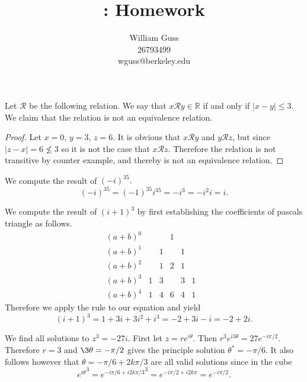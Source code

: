 \documentclass[letter]{article}
\title{\bCLASS: Homework \bHWN}
\author{William Guss\\26793499\\wguss@berkeley.edu}
\newenvironment{menumerate}{%
  \edef\backupindent{\the\parindent}%
  \enumerate%
  \setlength{\parindent}{\backupindent}%
}{\endenumerate}
\begin{document}
\maketitle
\thispagestyle{empty}

\begin{menumerate}
\setcounter{enumi}{31}
	\item Let $\mathcal{R}$ be the following relation. We say that $x \mathcal{R} y \in \mathbb{R}$ if and only if $|x -y| \leq 3$. We claim that the relation is not an equivalence relation.

	\begin{proof}
		Let $x = 0$, $y = 3$, $z =6.$ It is obvious that $x\mathcal{R}y$ and $y\mathcal{R}z$, but since $|z-x| = 6 \not\leq 3$ so it is not the case that $x \mathcal{R} z$. Therefore the relation is not transitive by counter example, and thereby is not an equivalence relation.
	\end{proof}

	\setcounter{enumi}{3}
	\item We compute the result of $(-i)^{35}.$ 
	\begin{equation*}
		(-i)^{35} = (-1)^{35}i^{35} = -i^3 = -i^2i = i.
	\end{equation*}
	\setcounter{enumi}{7}
	\item We compute the result of $(i+1)^3$ by first establishing the coefficients of pascals triangle as follows.
	\begin{equation*}
		\begin{array}{ccccccc}
			{(a+b)}^0&	&&1 \\
			{(a+b)}^1&      & 1 & &1 &   &  \\
			{(a+b)}^2&  & 1 & 2 & 1 &    \\
			{(a+b)}^3& 1 & 3 & & 3 & 1 & \\
			{(a+b)}^4&     1 & 4 & 6 & 4 & 1
		\end{array}
	\end{equation*}
	Therefore we apply the rule to our equation and yield
	\begin{equation*}
		(i+1)^3 = 1 +3i + 3i^2 + i^3 = -2 + 3i - i = -2 +2i.
	\end{equation*}

	\setcounter{enumi}{18}
	\item We find all solutions to $z^3 = -27i.$ First let $z = re^{i\theta}.$ Then $r^3e^{i3\theta} = 27e^{-i\pi/2}$. Therefore $r = 3$ and $\3\theta = -\pi/2$ gives the principle solution $\theta^* = -\pi/6.$ It also follows however that $\theta = -\pi/6 +2k\pi/3$ are all valid solutions since in the cube 
	\begin{equation*}
		{e^{i\theta}}^3 = {e^{-i\pi/6 +i2k\pi/3}}^3 = e^{-i\pi/2 + i2k\pi} = e^{-i\pi/2}.
	\end{equation*}


\end{menumerate}
\end{document}
